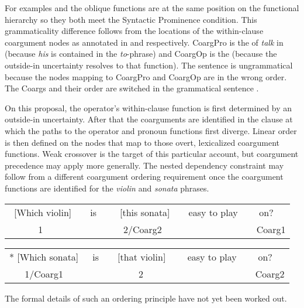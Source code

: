 \documentclass[output=paper,hidelinks]{langscibook}
\begin{document}
\z\z

\noindent  For examples  and  the oblique functions are at the same position on the functional hierarchy so they both meet the Syntactic Prominence condition.  This grammaticality difference follows from the locations of the within-clause coargument nodes as annotated in  and  respectively. CoargPro is the  of \textit{talk} in   (because \textit{his} is contained in the \textit{to}-phrase) and CoargOp is the  (because the outside-in uncertainty resolves to that function).    The sentence is ungrammatical because the nodes mapping to CoargPro and \mbox{CoargOp} are in the wrong order.  The Coargs and their order are switched in the grammatical sentence .

On this proposal, the operator's within-clause function is first determined by an outside-in uncertainty. After that the coarguments are identified in the clause at which the paths to the operator and pronoun functions first diverge. Linear order is then defined on the nodes that map to those overt, lexicalized coargument functions.  Weak crossover is the  target of this particular account, but coargument precedence may apply more generally.  The nested dependency constraint  may follow from a different coargument ordering requirement once the coargument functions are identified for the \textit{violin} and \textit{sonata} phrases. 

\ea\label{coarg}
\ea\label{coargviolin}\begin{tabular}[t]{@{}c@{}c@{}c@{}c@{}c@{}} 
   \ [Which  violin] &\ \ is\  \ &\  [this  sonata]    &\  \ easy to play  & on?\\[-.5ex]
        \small  1            &        &   \small 2/Coarg2     &                      & \small \ \ Coarg1
 \end{tabular}
\ex\label{coargsonata} \begin{tabular}[t]{@{}c@{}c@{}c@{}c@{}c} 
   * [Which  sonata] & \ is  &\ \  [that violin] \   &\  easy to play  & on?\\[-.5ex]
   \small       1/Coarg1  &        &    \small  2           &                        & \small \ \ Coarg2
 \end{tabular}
\z\z

\noindent  The formal details of such an ordering principle have not yet been worked out.
 
\end{document}
